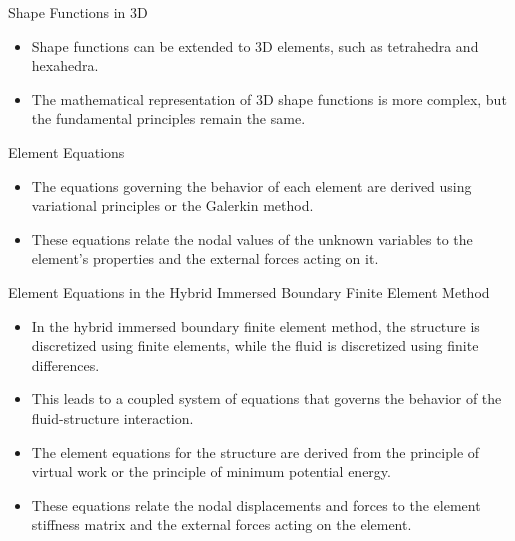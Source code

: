 \documentclass{beamer}
\begin{document}
\begin{frame}{Shape Functions in 3D}
    \begin{itemize}
        \item Shape functions can be extended to 3D elements, such as tetrahedra and hexahedra.
        \item The mathematical representation of 3D shape functions is more complex, but the fundamental principles remain the same.
    \end{itemize}
\end{frame}

\begin{frame}{Element Equations}
    \begin{itemize}
        \item The equations governing the behavior of each element are derived using variational principles or the Galerkin method.
        \item These equations relate the nodal values of the unknown variables to the element's properties and the external forces acting on it.
    \end{itemize}
\end{frame}

\begin{frame}{Element Equations in the Hybrid Immersed Boundary Finite Element Method}
    \begin{itemize}
        \item In the hybrid immersed boundary finite element method, the structure is discretized using finite elements, while the fluid is discretized using finite differences.
        \item This leads to a coupled system of equations that governs the behavior of the fluid-structure interaction.
        \item The element equations for the structure are derived from the principle of virtual work or the principle of minimum potential energy.
        \item These equations relate the nodal displacements and forces to the element stiffness matrix and the external forces acting on the element.
    \end{itemize}
\end{frame}
\end{document}
